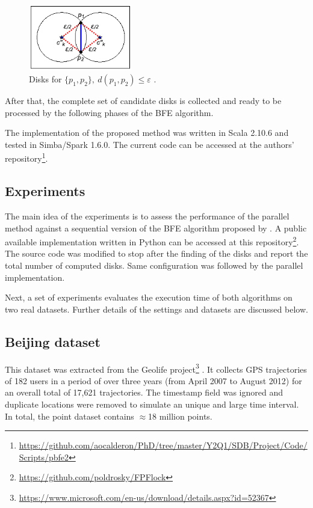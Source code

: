 \documentclass[12pt]{scrartcl}
\begin{document}
\begin{figure}
 \centering
 \includegraphics[width=0.4\textwidth]{figures/theorem} 
 \caption{Disks for $\{p_1,p_2\},\ d(p_1,p_2) \leq \varepsilon$ \citep{vieira_-line_2009}.}
 \label{fig:theorem}
\end{figure}

After that, the complete set of candidate disks is collected and ready to be processed by the following phases of the BFE algorithm. 

The implementation of the proposed method was written in Scala 2.10.6 and tested in Simba/Spark 1.6.0.  The current code can be accessed at the authors' repository\footnote{ \url{https://github.com/aocalderon/PhD/tree/master/Y2Q1/SDB/Project/Code/Scripts/pbfe2}}.

\subsection{Experiments}\label{sec:experiments}
The main idea of the experiments is to assess the performance of the parallel method against a sequential version of the BFE algorithm proposed by \cite{vieira_-line_2009}.  A public available implementation written in Python can be accessed at this repository\footnote{\url{https://github.com/poldrosky/FPFlock}}.  The source code was modified to stop after the finding of the disks and report the total number of computed disks.  Same configuration was followed by the parallel implementation.

Next, a set of experiments evaluates the execution time of both algorithms on two real datasets.  Further details of the settings and datasets are discussed below.

\subsection{Beijing dataset}
This dataset was extracted from the Geolife project\footnote{\url{https://www.microsoft.com/en-us/download/details.aspx?id=52367}} \citep{zheng_understanding_2008, zheng_mining_2009, zheng_geolife:_2010}.  It collects GPS trajectories of 182 users in a period of over three years (from April 2007 to August 2012) for an overall total of 17,621 trajectories.  The timestamp field was ignored and duplicate locations were removed to simulate an unique and large time interval.  In total, the point dataset contains $\approx$18 million points.
\end{document}

